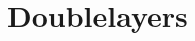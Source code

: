 \documentclass[\main/dresen_thesis.tex]{subfiles}
\begin{document}
\section{Doublelayers}
\end{document}
